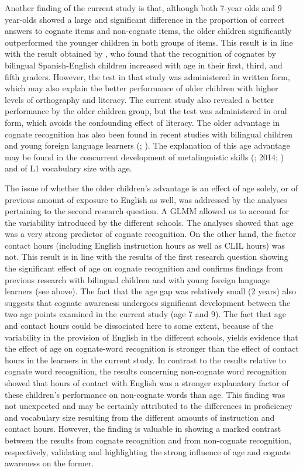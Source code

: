 \documentclass[output=paper,modfonts,nonflat,newtxmath]{langsci/langscibook}
\begin{document}
{Another finding of the current study is that, although both 7-year olds and 9 year-olds showed a large and significant difference in the proportion of correct answers to cognate items and non-cognate items, the older children significantly outperformed the younger children in both groups of items. This result is in line with the result obtained by \citet{MalabongaEtAl2008}, who found that the recognition of cognates by bilingual Spanish-English children increased with age in their first, third, and fifth graders. However, the test in that study was administered in written form, which may also explain the better performance of older children with higher levels of orthography and literacy. The current study also revealed a better performance by the older children group, but the test was administered in oral form, which avoids the confounding effect of literacy. The older advantage in cognate recognition has also been found in recent studies with bilingual children \citep{BosmaEtAl2019} and young foreign language learners (\citealt{GoriotEtAl2018}; \citealt{MuñozEtAl2018}). The explanation of this age advantage may be found in the concurrent development of metalinguistic skills (\citealt{Muñoz2006}; 2014; \citealt{KelleyKohnert2012}) and of L1 vocabulary size \citep{UnsworthEtAl2015} with age.}

{The issue of whether the older children’s advantage is an effect of age solely, or of previous amount of exposure to English as well, was addressed by the analyses pertaining to the second research question. A GLMM allowed us to account for the variability introduced by the different schools. The analyses showed that age was a very strong predictor of cognate recognition. On the other hand, the factor contact hours (including English instruction hours as well as CLIL hours) was not. This result is in line with the results of the first research question showing the significant effect of age on cognate recognition and confirms findings from previous research with bilingual children and with young foreign language learners (see above). The fact that the age gap was relatively small (2 years) also suggests that cognate awareness undergoes significant development between the two age points examined in the current study (age 7 and 9). The fact that age and contact hours could be dissociated here to some extent, because of the variability in the provision of English in the different schools, yields evidence that the effect of age on cognate-word recognition is stronger than the effect of contact hours in the learners in the current study. In contrast to the results relative to cognate word recognition, the results concerning non-cognate word recognition showed that hours of contact with English was a stronger explanatory factor of these children’s performance on non-cognate words than age. This finding was not unexpected and may be certainly attributed to the differences in proficiency and vocabulary size resulting from the different amounts of instruction and contact hours. However, the finding is valuable in showing a marked contrast between the results from cognate recognition and from non-cognate recognition, respectively, validating and highlighting the strong influence of age and cognate awareness on the former.}
\end{document}
